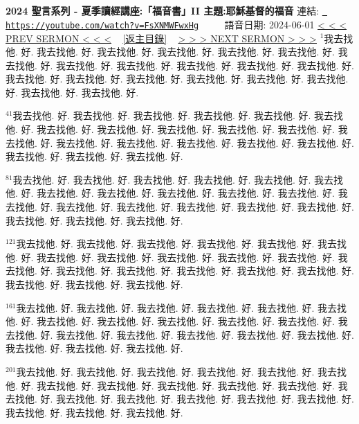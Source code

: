 \documentclass{book}
\begin{document}
\section{}
\label{sec:FsXNMWFwxHg}
\textbf{2024 聖言系列 - 夏季讀經講座:「福音書」II 主題:耶穌基督的福音}
\newline
\newline
連結: \href{https://youtube.com/watch?v=FsXNMWFwxHg}{\texttt{ https://youtube.com/watch?v=FsXNMWFwxHg}} ~~~~ 語音日期: 2024-06-01 
\newline
\newline
\hyperref[sec:BQvEiworls4]{\small{< < < PREV SERMON < < <}}
~
\hyperref[sec:index]{\small{[返主目錄]}}
~
\hyperref[sec:5AhQhWw7knY]{\small{> > > NEXT SERMON > > >}}
\newline
\newline
$^{1}$我去找他.
好.
我去找他.
好.
我去找他.
好.
我去找他.
好.
我去找他.
好.
我去找他.
好.
我去找他.
好.
我去找他.
好.
我去找他.
好.
我去找他.
好.
我去找他.
好.
我去找他.
好.
我去找他.
好.
我去找他.
好.
我去找他.
好.
我去找他.
好.
我去找他.
好.
我去找他.
好.
我去找他.
好.
我去找他.
好.

$^{41}$我去找他.
好.
我去找他.
好.
我去找他.
好.
我去找他.
好.
我去找他.
好.
我去找他.
好.
我去找他.
好.
我去找他.
好.
我去找他.
好.
我去找他.
好.
我去找他.
好.
我去找他.
好.
我去找他.
好.
我去找他.
好.
我去找他.
好.
我去找他.
好.
我去找他.
好.
我去找他.
好.
我去找他.
好.
我去找他.
好.

$^{81}$我去找他.
好.
我去找他.
好.
我去找他.
好.
我去找他.
好.
我去找他.
好.
我去找他.
好.
我去找他.
好.
我去找他.
好.
我去找他.
好.
我去找他.
好.
我去找他.
好.
我去找他.
好.
我去找他.
好.
我去找他.
好.
我去找他.
好.
我去找他.
好.
我去找他.
好.
我去找他.
好.
我去找他.
好.
我去找他.
好.

$^{121}$我去找他.
好.
我去找他.
好.
我去找他.
好.
我去找他.
好.
我去找他.
好.
我去找他.
好.
我去找他.
好.
我去找他.
好.
我去找他.
好.
我去找他.
好.
我去找他.
好.
我去找他.
好.
我去找他.
好.
我去找他.
好.
我去找他.
好.
我去找他.
好.
我去找他.
好.
我去找他.
好.
我去找他.
好.
我去找他.
好.

$^{161}$我去找他.
好.
我去找他.
好.
我去找他.
好.
我去找他.
好.
我去找他.
好.
我去找他.
好.
我去找他.
好.
我去找他.
好.
我去找他.
好.
我去找他.
好.
我去找他.
好.
我去找他.
好.
我去找他.
好.
我去找他.
好.
我去找他.
好.
我去找他.
好.
我去找他.
好.
我去找他.
好.
我去找他.
好.
我去找他.
好.

$^{201}$我去找他.
好.
我去找他.
好.
我去找他.
好.
我去找他.
好.
我去找他.
好.
我去找他.
好.
我去找他.
好.
我去找他.
好.
我去找他.
好.
我去找他.
好.
我去找他.
好.
我去找他.
好.
我去找他.
好.
我去找他.
好.
我去找他.
好.
我去找他.
好.
我去找他.
好.
我去找他.
好.
我去找他.
好.
我去找他.
好.
\end{document}
